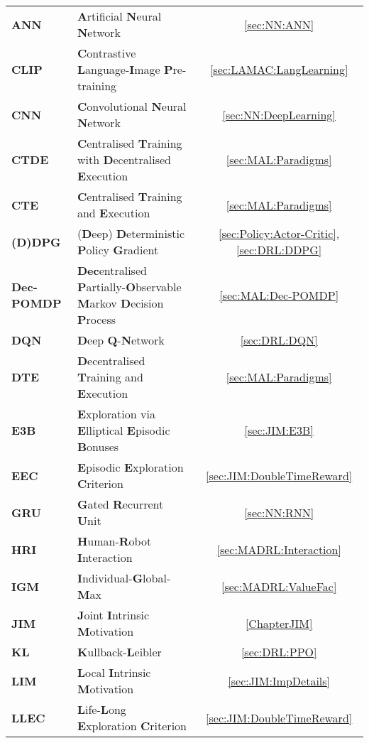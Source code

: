 \documentclass[
11pt, %
english, %
singlespacing, %
parskip, %
headsepline, %
]{MastersDoctoralThesis} %
\begin{document}
\begin{abbreviations}{}
\begin{tabularx}{\textwidth}{lXc}
\textbf{ANN} & \textbf{A}rtificial \textbf{N}eural \textbf{N}etwork & \ref{sec:NN:ANN} \\
\textbf{CLIP} & \textbf{C}ontrastive \textbf{L}anguage-\textbf{I}mage \textbf{P}re-training & \ref{sec:LAMAC:LangLearning} \\
\textbf{CNN} & \textbf{C}onvolutional \textbf{N}eural \textbf{N}etwork & \ref{sec:NN:DeepLearning} \\
\textbf{CTDE} & \textbf{C}entralised \textbf{T}raining with \textbf{D}ecentralised \textbf{E}xecution & \ref{sec:MAL:Paradigms} \\
\textbf{CTE} & \textbf{C}entralised \textbf{T}raining and \textbf{E}xecution & \ref{sec:MAL:Paradigms} \\
\textbf{(D)DPG} & (\textbf{D}eep) \textbf{D}eterministic \textbf{P}olicy \textbf{G}radient & \ref{sec:Policy:Actor-Critic}, \ref{sec:DRL:DDPG} \\
\textbf{Dec-POMDP} & \textbf{Dec}entralised \textbf{P}artially-\textbf{O}bservable \textbf{M}arkov \textbf{D}ecision \textbf{P}rocess & \ref{sec:MAL:Dec-POMDP} \\
\textbf{DQN} & \textbf{D}eep \textbf{Q}-\textbf{N}etwork & \ref{sec:DRL:DQN} \\
\textbf{DTE} & \textbf{D}ecentralised \textbf{T}raining and \textbf{E}xecution & \ref{sec:MAL:Paradigms} \\
\textbf{E3B} & \textbf{E}xploration via \textbf{E}lliptical \textbf{E}pisodic \textbf{B}onuses & \ref{sec:JIM:E3B} \\
\textbf{EEC} & \textbf{E}pisodic \textbf{E}xploration \textbf{C}riterion & \ref{sec:JIM:DoubleTimeReward} \\
\textbf{GRU} & \textbf{G}ated \textbf{R}ecurrent \textbf{U}nit & \ref{sec:NN:RNN} \\
\textbf{HRI} & \textbf{H}uman-\textbf{R}obot \textbf{I}nteraction & \ref{sec:MADRL:Interaction} \\
\textbf{IGM} & \textbf{I}ndividual-\textbf{G}lobal-\textbf{M}ax & \ref{sec:MADRL:ValueFac} \\
\textbf{JIM} & \textbf{J}oint \textbf{I}ntrinsic \textbf{M}otivation & \ref{ChapterJIM} \\
\textbf{KL} & \textbf{K}ullback-\textbf{L}eibler & \ref{sec:DRL:PPO} \\
\textbf{LIM} & \textbf{L}ocal \textbf{I}ntrinsic \textbf{M}otivation & \ref{sec:JIM:ImpDetails} \\
\textbf{LLEC} & \textbf{L}ife-\textbf{L}ong \textbf{E}xploration \textbf{C}riterion & \ref{sec:JIM:DoubleTimeReward} \\

\end{tabularx}
\end{abbreviations}
\end{document}
